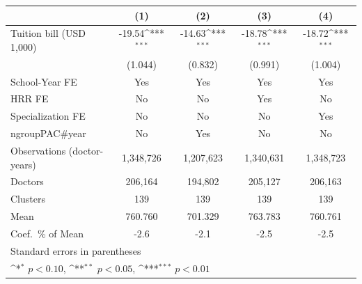 {
\def\sym#1{\ifmmode^{#1}\else\(^{#1}\)\fi}
\begin{tabular}{l*{4}{c}}
\hline\hline
                    &\multicolumn{1}{c}{(1)}         &\multicolumn{1}{c}{(2)}         &\multicolumn{1}{c}{(3)}         &\multicolumn{1}{c}{(4)}         \\
\hline
Tuition bill (USD 1,000)&      -19.54\sym{***}&      -14.63\sym{***}&      -18.78\sym{***}&      -18.72\sym{***}\\
                    &     (1.044)         &     (0.832)         &     (0.991)         &     (1.004)         \\
[1em]
School-Year FE      &         Yes         &         Yes         &         Yes         &         Yes         \\
[1em]
HRR FE              &          No         &          No         &         Yes         &          No         \\
[1em]
Specialization FE   &          No         &          No         &          No         &         Yes         \\
[1em]
ngroupPAC#year      &          No         &         Yes         &          No         &          No         \\
\hline
Observations (doctor-years)&   1,348,726         &   1,207,623         &   1,340,631         &   1,348,723         \\
Doctors             &     206,164         &     194,802         &     205,127         &     206,163         \\
Clusters            &         139         &         139         &         139         &         139         \\
Mean                &     760.760         &     701.329         &     763.783         &     760.761         \\
Coef.\ \% of Mean   &        -2.6         &        -2.1         &        -2.5         &        -2.5         \\
\hline\hline
\multicolumn{5}{l}{\footnotesize Standard errors in parentheses}\\
\multicolumn{5}{l}{\footnotesize \sym{*} \(p<0.10\), \sym{**} \(p<0.05\), \sym{***} \(p<0.01\)}\\
\end{tabular}
}
